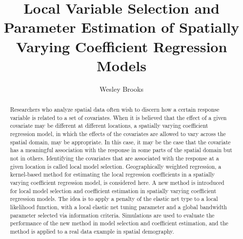 \documentclass[authoryear, review, 11pt]{elsarticle}
\title{Local Variable Selection and Parameter Estimation of Spatially Varying Coefficient Regression Models}
\author{Wesley Brooks}
\date{}                                           %
\begin{document}
\begin{abstract}
Researchers who analyze spatial data often wish to discern how a certain response variable is related to a set of covariates. When it is believed that the effect of a given covariate may be different at different locations, a spatially varying coefficient regression model, in which the effects of the covariates are allowed to vary across the spatial domain, may be appropriate. In this case, it may be the case that the covariate has a meaningful association with the response in some parts of the spatial domain but not in others. Identifying the covariates that are associated with the response at a given location is called local model selection. Geographically weighted regression, a kernel-based method for estimating the local regression coefficients in a spatially varying coefficient regression model, is considered here. A new method is introduced for local model selection and coefficient estimation in spatially varying coefficient regression models. The idea is to apply a penalty of the elastic net type to a local likelihood function, with a local elastic net tuning parameter and a global bandwidth parameter selected via information criteria. Simulations are used to evaluate the performance of the new method in model selection and coefficient estimation, and the method is applied to a real data example in spatial demography.
\end{abstract}

\maketitle


\end{document}
